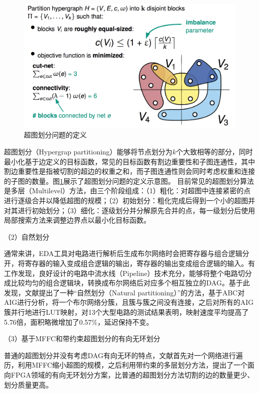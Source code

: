 \begin{figure}[!htbp]
    \centering
    \includegraphics[width=0.8\linewidth]{./figs/Hypergraph_partition.png}
    \caption{超图划分问题的定义}
    \label{Hypergraph_partition}
\end{figure}

超图划分（Hypergrap partitioning）\cite{KaHyPar}能够将节点划分为$k$个大致相等的部分，同时最小化基于边定义的目标函数，常见的目标函数有割边重要性和子图连通性，其中割边重要性是指被切割的超边的权重之和，而子图连通性则会同时考虑权重和连接的子图的数量。图\ref{Hypergraph_partition}展示了超图划分问题的定义示意图。
目前常见的超图划分算法是多层（Multilevel）方法，由三个阶段组成：（1）粗化：对超图中连接紧密的点进行逐级合并以降低超图的规模；（2）初始划分：粗化完成后得到一个小的超图并对其进行初始划分；（3）细化：逐级划分并分解原先合并的点，每一级划分后使用局部搜索方法来调整边界点以最小化目标函数。

（2）自然划分

通常来讲，EDA工具对电路进行解析后生成布尔网络时会把寄存器与组合逻辑分开，将寄存器的输入变成组合逻辑的输出，寄存器的输出变成组合逻辑的输入。有工作发现，良好设计的电路中流水线（Pipeline）技术充分，能够将整个电路切分成比较均匀的组合逻辑块，转换成布尔网络后对应多个相互独立的DAG。基于此发现，文献\cite{Moucheng_Yang}提出了一种“自然划分（Natural partitioning）”的方法，基于ABC\cite{LS:ABC}对AIG进行分析，将一个布尔网络分簇，且簇与簇之间没有连接，之后对所有的AIG簇并行地进行LUT映射，对13个大型电路的测试结果表明，映射速度平均提高了5.76倍，面积略微增加了0.57\%，延迟保持不变。

（3）基于MFFC和带约束超图划分的有向无环划分

普通的超图划分并没有考虑DAG有向无环的特点，文献\cite{FPGA:Jason_Cong_patition}首先对一个网络进行遍历，利用MFFC缩小超图的规模，之后利用带约束的多层划分方法，提出了一个面向FPGA领域的有向无环划分方案，比普通的超图划分方法切割的边的数量更少、划分质量更高。

